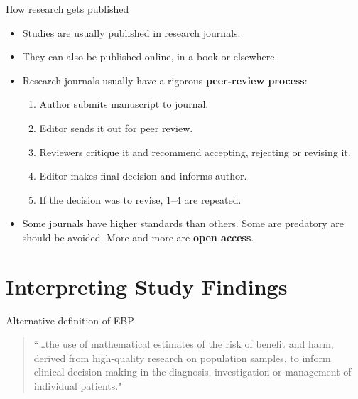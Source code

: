 \documentclass{beamer}
\begin{document}
%
\begin{frame}
\center{\Huge{\textcolor{darkgray}{How Research Gets Published}}}
\end{frame}

% 
\begin{frame}{How research gets published}
	\begin{itemize}
	\item Studies are usually published in research journals.
	\item They can also be published online, in a book or elsewhere.
	\item Research journals usually have a rigorous \textbf{peer-review process}:
		\begin{enumerate}
		\item Author submits manuscript to journal.
		\item Editor sends it out for peer review.
		\item Reviewers critique it and recommend accepting, rejecting or revising it.
		\item Editor makes final decision and informs author.
		\item If the decision was to revise, 1--4 are repeated.
		\end{enumerate}
	\item Some journals have higher standards than others. Some are predatory are should be avoided. More and more are \textbf{open access}.
	\end{itemize}
\end{frame} 

\section*{Interpreting Study Findings}

%
\begin{frame}
\center{\Huge{\textcolor{darkgray}{Interpreting Study Findings}}}
\end{frame}

% 
\begin{frame}{Alternative definition of EBP}
	\begin{quote}
	``\dots the use of mathematical estimates of the risk of benefit and harm, derived from high-quality research on population samples, to inform clinical decision making in the diagnosis, investigation or management of individual patients." \citep[p. 1]{Greenhalgh2010}
	\end{quote}
\end{frame}
\end{document}
